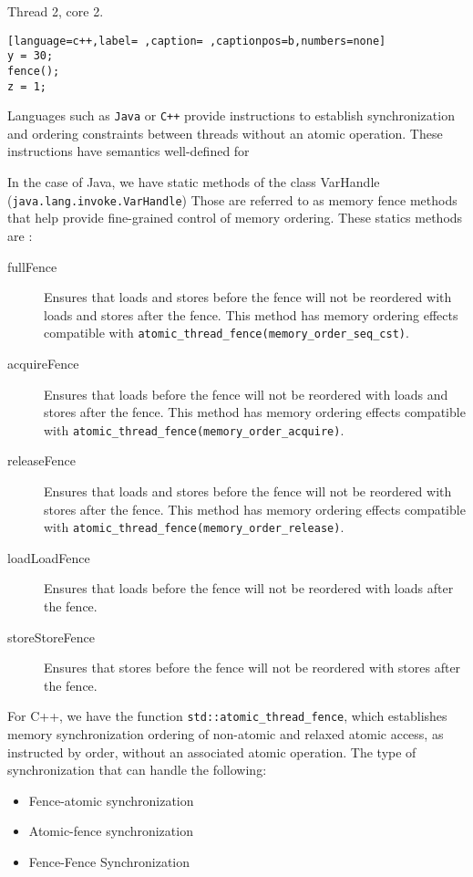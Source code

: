 Thread 2, core 2.
\begin{lstlisting}[language=c++,label= ,caption= ,captionpos=b,numbers=none]
y = 30;
fence();
z = 1;
\end{lstlisting}


Languages such as \texttt{Java} or \texttt{C++} provide instructions to establish synchronization
and ordering constraints between threads without an atomic operation. These
instructions have semantics well-defined for

In the case of Java, we have static methods of the class VarHandle
(\texttt{java.lang.invoke.VarHandle}) Those are referred to as memory fence methods that help provide fine-grained control of memory ordering. These statics
methods are \cite{varHandleJdk92017}:

\begin{description}
\item[{fullFence}] Ensures that loads and stores before the fence will not be
reordered with loads and stores after the fence. This method has memory
ordering effects compatible with
\texttt{atomic\_thread\_fence(memory\_order\_seq\_cst)}.
\item[{acquireFence}] Ensures that loads before the fence will not be reordered
with loads and stores after the fence. This method has memory ordering
effects compatible with \texttt{atomic\_thread\_fence(memory\_order\_acquire)}.
\item[{releaseFence}] Ensures that loads and stores before the fence will not
be reordered with stores after the fence. This method has memory ordering
effects compatible with \texttt{atomic\_thread\_fence(memory\_order\_release)}.
\item[{loadLoadFence}] Ensures that loads before the fence will not be
reordered with loads after the fence.
\item[{storeStoreFence}] Ensures that stores before the fence will not be
reordered with stores after the fence.
\end{description}

For C++, we have the function
\texttt{std::atomic\_thread\_fence}\cite{threadFenceCpp2020}, which establishes
memory synchronization ordering of non-atomic and relaxed atomic access, as
instructed by order, without an associated atomic operation. The type of
synchronization that can handle the following:

\begin{itemize}
\item Fence-atomic synchronization
\item Atomic-fence synchronization
\item Fence-Fence Synchronization
\end{itemize}

